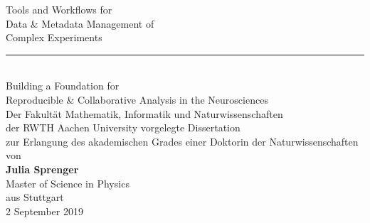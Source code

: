 \documentclass[
    pdftex,
    fontsize=11pt,
    a4paper
   ]{scrbook}
\renewcommand{\title}{\LARGE Tools and Workflows for\\\LARGE Data \& Metadata Management of\\\LARGE Complex Experiments}
\renewcommand{\subtitle}{Building a Foundation for \\Reproducible \& Collaborative Analysis in the Neurosciences}
\newcommand{\thesisdate}{2 September  2019}
\newcommand{\thesisauthor}{Julia Sprenger}
\newcommand{\authorbirthplace}{Stuttgart}
\newcommand{\authordegree}{Master of Science in Physics}
\begin{document}
\begin{titlepage}
    \begin{center}
        \Large
        \title\\
        \vspace{1cm}
        \textcolor{black!50}{\rule{3cm}{0.4pt}}\\
        \vspace{1cm}
        \Large\subtitle\\
        \vspace{3.5cm}
        \large
        Der Fakultät Mathematik, Informatik und Naturwissenschaften\\
        der RWTH Aachen University vorgelegte Dissertation\\
        zur Erlangung des akademischen Grades einer Doktorin der Naturwissenschaften\\
        \vspace{2cm}
        von\\
        \large{\textbf{\thesisauthor{}}}\\
        \normalsize
        \authordegree\\
        \vspace{0.5cm}
        aus \authorbirthplace\\
        \vspace{2cm}
        \large
        \thesisdate
    \end{center}
\end{titlepage}
\end{document}
